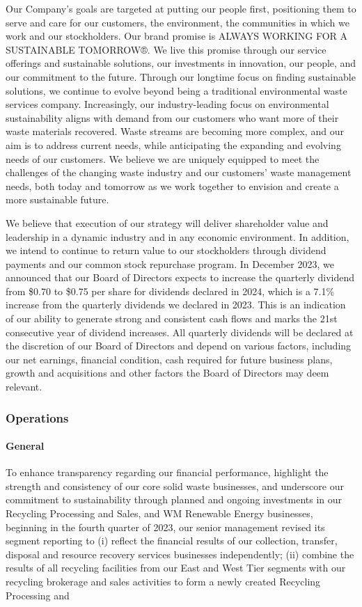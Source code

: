 \documentclass{article}
\begin{document}
Our Company's goals are targeted at putting our people first, positioning them to serve and care for our customers, the environment, the communities in which we work and our stockholders. Our brand promise is ALWAYS WORKING FOR A SUSTAINABLE TOMORROW®. We live this promise through our service offerings and sustainable solutions, our investments in innovation, our people, and our commitment to the future. Through our longtime focus on finding sustainable solutions, we continue to evolve beyond being a traditional environmental waste services company. Increasingly, our industry-leading focus on environmental sustainability aligns with demand from our customers who want more of their waste materials recovered. Waste streams are becoming more complex, and our aim is to address current needs, while anticipating the expanding and evolving needs of our customers. We believe we are uniquely equipped to meet the challenges of the changing waste industry and our customers’ waste management needs, both today and tomorrow as we work together to envision and create a more sustainable future.

We believe that execution of our strategy will deliver shareholder value and leadership in a dynamic industry and in any economic environment. In addition, we intend to continue to return value to our stockholders through dividend payments and our common stock repurchase program. In December 2023, we announced that our Board of Directors expects to increase the quarterly dividend from \$0.70 to \$0.75 per share for dividends declared in 2024, which is a 7.1\% increase from the quarterly dividends we declared in 2023. This is an indication of our ability to generate strong and consistent cash flows and marks the 21st consecutive year of dividend increases. All quarterly dividends will be declared at the discretion of our Board of Directors and depend on various factors, including our net earnings, financial condition, cash required for future business plans, growth and acquisitions and other factors the Board of Directors may deem relevant.

\subsubsection{Operations}

\paragraph{General}

To enhance transparency regarding our financial performance, highlight the strength and consistency of our core solid waste businesses, and underscore our commitment to sustainability through planned and ongoing investments in our Recycling Processing and Sales, and WM Renewable Energy businesses, beginning in the fourth quarter of 2023, our senior management revised its segment reporting to (i) reflect the financial results of our collection, transfer, disposal and resource recovery services businesses independently; (ii) combine the results of all recycling facilities from our East and West Tier segments with our recycling brokerage and sales activities to form a newly created Recycling Processing and
\end{document}

